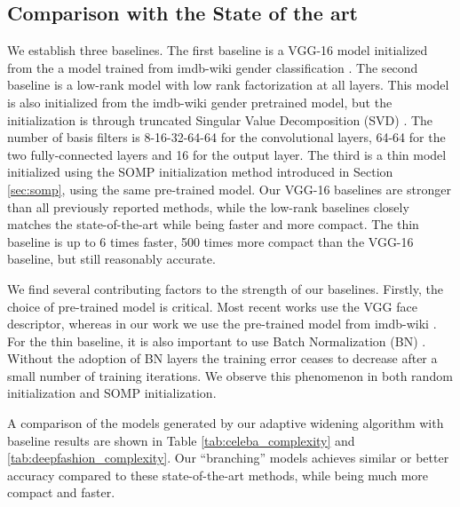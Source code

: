 \documentclass[10pt,twocolumn,letterpaper]{article}
\begin{document}
\subsection{Comparison with the State of the art}

We establish three baselines. The first baseline is a VGG-16 model initialized from the a model trained from imdb-wiki gender classification \cite{imdb}. The second baseline is a low-rank model with low rank factorization at all layers. This model is also initialized from the imdb-wiki gender pretrained model, but the initialization is through truncated Singular Value Decomposition (SVD) \cite{denton2014exploiting}. The number of basis filters is 8-16-32-64-64 for the convolutional layers, 64-64 for the two fully-connected layers and 16 for the output layer. The third is a thin model initialized using the SOMP initialization method introduced in Section \ref{sec:somp}, using the same pre-trained model. Our VGG-16 baselines are stronger than all previously reported methods, while the low-rank baselines closely matches the state-of-the-art while being faster and more compact. The thin baseline is up to 6 times faster, 500 times more compact than the VGG-16 baseline, but still reasonably accurate. 

We find several contributing factors to the strength of our baselines. Firstly, the choice of pre-trained model is critical. Most recent works use the VGG face descriptor, whereas in our work we use the pre-trained model from  imdb-wiki \cite{imdb-wiki}. For the thin baseline, it is also important to use Batch Normalization (BN) \cite{ioffe2015batch}. Without the adoption of BN layers the training error ceases to decrease after a small number of training iterations. We observe this phenomenon in both random initialization and SOMP initialization.

A comparison of the models generated by our adaptive widening algorithm with baseline results are shown in Table \ref{tab:celeba_complexity} and \ref{tab:deepfashion_complexity}. Our ``branching'' models achieves similar or better accuracy compared to these state-of-the-art methods, while being much more compact and faster. 
\end{document}
